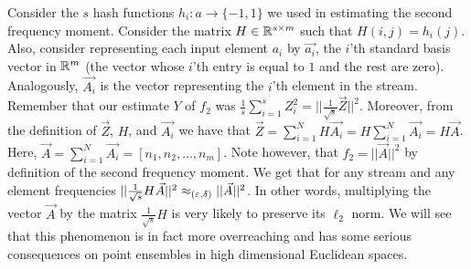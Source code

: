 \documentclass{article}
\begin{document}
Consider the $s$ hash functions $h_i:a\rightarrow \{-1,1\}$ we used in estimating the second frequency moment.  
Consider the matrix $H \in {\mathbb{R}}^{s \times m}$ such that $H(i,j) = h_{i}(j)$.
Also, consider representing each input element $a_i$ by $\vec{a_i}$, the $i$'th 
standard basis vector in ${\mathbb{R}}^m$ (the vector whose $i$'th entry is equal to $1$ and the rest are zero). 
Analogously, $\vec{A_i}$ is the vector representing the $i$'th element in the stream. 
Remember that our estimate $Y$ of $f_2$ was $\frac{1}{s}\sum_{i=1}^{s}Z_{i}^2= ||\frac{1}{\sqrt{s}}\vec{Z}||^2$. 
Moreover, from the definition of $\vec{Z}$, $H$, and $\vec{A_i}$ we have 
that $\vec{Z} = \sum_{i=1}^{N}H\vec{A_i} = H\sum_{i=1}^{N}\vec{A_i} = H\vec{A}$. 
Here, $\vec{A} = \sum_{i=1}^{N}\vec{A_i} = [n_1,n_2,\ldots,n_m]$. 
Note however, that $f_2 = ||\vec{A}||^2$ by definition of the second frequency moment.
We get that for any stream and any element frequencies $ ||\frac{1}{\sqrt{s}}H\vec{A}||^2 \approx_{(\varepsilon,\delta)} ||\vec{A}||^2$.
In other words,  multiplying the vector $\vec{A}$ by the matrix $\frac{1}{\sqrt{s}}H$ is very likely to preserve its $\ell_2$ norm.
We will see that this phenomenon is in fact more overreaching and has some serious consequences on point ensembles in high dimensional Euclidean spaces. 




\end{document}
